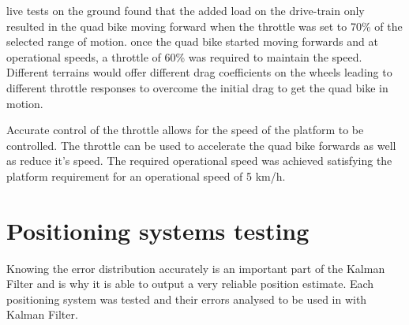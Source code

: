 \documentclass[main.tex]{subfiles}
\begin{document}
live tests on the ground found that the added load on the drive-train only resulted in the quad bike moving forward when the throttle was set to 70\% of the selected range of motion. once the quad bike started moving forwards and at operational speeds, a throttle of 60\% was required to maintain the speed. Different terrains would offer different drag coefficients on the wheels leading to different throttle responses to overcome the initial drag to get the quad bike in motion.

Accurate control of the throttle allows for the speed of the platform to be controlled. The throttle can be used to accelerate the quad bike forwards as well as reduce it's speed. The required operational speed was achieved satisfying the platform requirement for an operational speed of 5 km/h. 
\section{Positioning systems testing}
Knowing the error distribution accurately is an important part of the Kalman Filter and is why it is able to output a very reliable position estimate. Each positioning system was tested and their errors analysed to be used in with Kalman Filter. 
\end{document}

